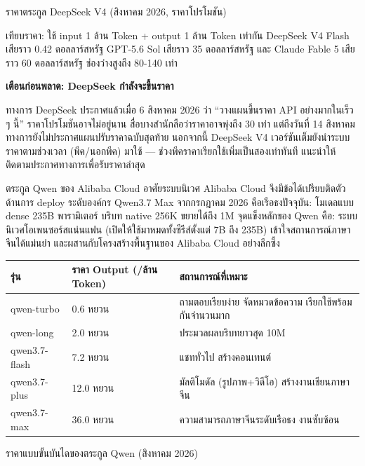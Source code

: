 \begin{center}\small\color{gray}ราคาตระกูล DeepSeek V4 (สิงหาคม 2026, ราคาโปรโมชัน)\end{center}

เทียบราคา: ใช้ input 1 ล้าน Token + output 1 ล้าน Token เท่ากัน DeepSeek V4 Flash เสียราว 0.42 ดอลลาร์สหรัฐ GPT-5.6 Sol เสียราว 35 ดอลลาร์สหรัฐ และ Claude Fable 5 เสียราว 60 ดอลลาร์สหรัฐ ช่องว่างสูงถึง 80-140 เท่า

\textbf{เตือนก่อนพลาด: DeepSeek กำลังจะขึ้นราคา}\par

ทางการ DeepSeek ประกาศแล้วเมื่อ 6 สิงหาคม 2026 ว่า “วางแผนขึ้นราคา API อย่างมากในเร็ว ๆ นี้” ราคาโปรโมชันอาจไม่อยู่นาน สื่อบางสำนักลือว่าราคาอาจพุ่งถึง 30 เท่า แต่ถึงวันที่ 14 สิงหาคมทางการยังไม่ประกาศแผนปรับราคาฉบับสุดท้าย นอกจากนี้ DeepSeek V4 เวอร์ชันเต็มยังนำระบบราคาตามช่วงเวลา (พีค/นอกพีค) มาใช้ — ช่วงพีคราคาเรียกใช้เพิ่มเป็นสองเท่าทันที แนะนำให้ติดตามประกาศทางการเพื่อรับราคาล่าสุด


ตระกูล Qwen ของ Alibaba Cloud อาศัยระบบนิเวศ Alibaba Cloud จึงมีข้อได้เปรียบติดตัวด้านการ deploy ระดับองค์กร Qwen3.7 Max จากกรกฎาคม 2026 คือเรือธงปัจจุบัน: โมเดลแบบ dense 235B พารามิเตอร์ บริบท native 256K ขยายได้ถึง 1M จุดแข็งหลักของ Qwen คือ: ระบบนิเวศโอเพนซอร์สแน่นแฟน (เปิดให้ใช้มาหมดทั้งซีรีส์ตั้งแต่ 7B ถึง 235B) เข้าใจสถานการณ์ภาษาจีนได้แม่นยำ และผสานกับโครงสร้างพื้นฐานของ Alibaba Cloud อย่างลึกซึ้ง

\begin{center}
\begin{tabularx}{\linewidth}{|X|X|X|}
\hline
\textbf{รุ่น} & \textbf{ราคา Output (/ล้าน Token)} & \textbf{สถานการณ์ที่เหมาะ} \tabularnewline
\hline
qwen-turbo & 0.6 หยวน & ถามตอบเรียบง่าย จัดหมวดข้อความ เรียกใช้พร้อมกันจำนวนมาก \tabularnewline
qwen-long & 2.0 หยวน & ประมวลผลบริบทยาวสุด 10M \tabularnewline
qwen3.7-flash & 7.2 หยวน & แชททั่วไป สร้างคอนเทนต์ \tabularnewline
qwen3.7-plus & 12.0 หยวน & มัลติโมดัล (รูปภาพ+วิดีโอ) สร้างงานเขียนภาษาจีน \tabularnewline
qwen3.7-max & 36.0 หยวน & ความสามารถภาษาจีนระดับเรือธง งานซับซ้อน \tabularnewline
\hline
\end{tabularx}
\end{center}

\begin{center}\small\color{gray}ราคาแบบขั้นบันไดของตระกูล Qwen (สิงหาคม 2026)\end{center}

